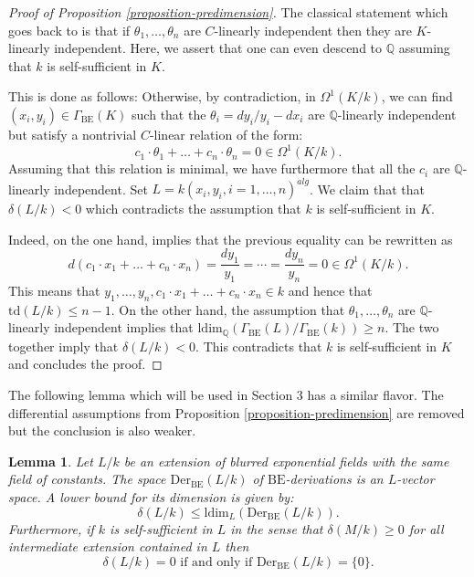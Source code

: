 \documentclass[12pt]{amsart}
\newcommand{\BE}{\mathrm{BE}}
\theoremstyle{definition}
\theoremstyle{plain}
\newtheorem{lem}[defn]{Lemma}
\theoremstyle{exampstyle}\newtheorem{thmx}{Theorem}
\theoremstyle{exampstyle}\newtheorem{thmxbis}{Theorem}
\begin{document}
\begin{proof}[Proof of Proposition \ref{proposition-predimension}] The classical statement which goes back to \cite{Ax-Theorem, Rosenlicht} is that if  $\theta_1,\ldots, \theta_n$ are $C$-linearly independent then they are $K$-linearly independent. Here, we assert that one can even descend to $\mathbb{Q}$ assuming that $k$ is self-sufficient in $K$. 

This is done as follows: Otherwise, by contradiction, in $\Omega^1(K/k)$, we can find $(x_i,y_i) \in \Gamma_{\BE}(K)$ such that the $\theta_i = dy_i/y_i - dx_i$ are $\mathbb{Q}$-linearly independent but satisfy a nontrivial $C$-linear relation of the form: 
$$ c_1 \cdot \theta_1 + \ldots + c_n \cdot \theta_n = 0 \in \Omega^1(K/k).$$
Assuming that this relation is minimal, we have furthermore that all the $c_i$ are $\mathbb{Q}$-linearly independent. Set $L = k(x_i,y_i, i = 1,\ldots, n)^{alg}$. We claim that that $\delta(L/k) < 0$ which contradicts the assumption that $k$ is self-sufficient in $K$.

Indeed, on the one hand, \cite[Proposition 4]{Rosenlicht} implies that the previous equality can be rewritten as
$$ d(c_1 \cdot x_1 + \ldots + c_n \cdot x_n) = \frac{dy_1}{y_1} = \cdots = \frac{dy_n}{y_n} = 0 \in \Omega^1(K/k).$$
This means that $y_1,\ldots,y_n, c_1 \cdot x_1 + \ldots + c_n \cdot x_n \in k$ and hence that $\mathrm{td}(L/k) \leq n - 1$. On the other hand, the assumption that $\theta_1,\ldots,\theta_n$ are $\mathbb{Q}$-linearly independent implies that $\mathrm{ldim}_\mathbb{Q}(\Gamma_{\BE}(L)/\Gamma_{\BE}(k)) \geq n$. The two together imply that $\delta(L/k) < 0$. This contradicts that $k$ is self-sufficient in $K$ and concludes the proof.
\end{proof}

The following lemma which will be used in Section 3 has a similar flavor. The differential assumptions from Proposition \ref{proposition-predimension} are removed but the conclusion is also weaker.


\begin{lem}\label{lemma-exponentialalgebra} 
Let $L/k$ be an extension of blurred exponential fields with the same field of constants. The space $\mathrm{Der}_{\BE}(L/k)$ of $\BE$-derivations is an $L$-vector space. A lower bound for its dimension is given by:
$$ \delta(L/k) \leq \mathrm{ldim}_L(\mathrm{Der}_{\BE}(L/k)).$$
Furthermore, if $k$ is self-sufficient in $L$ in the sense that $\delta(M/k) \geq 0$ for all intermediate extension contained in $L$ then 
$$ \delta(L/k) = 0 \text{ if and only if } \mathrm{Der}_{\BE}(L/k) = \lbrace 0 \rbrace.$$
\end{lem}
\end{document}
